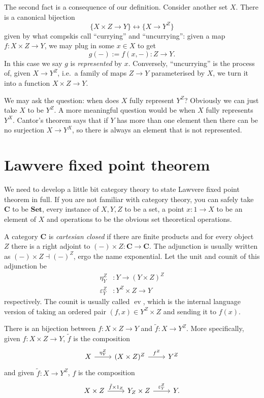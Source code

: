 \documentclass[a4paper]{article}
\renewcommand{\c}[1]{\mathbf{#1}}
\newcommand{\Set}{{\c{Set}}}
\begin{document}
The second fact is a consequence of our definition. Consider another set \(X\). There is a canonical bijection
\[
  \{X \times Z \to Y\} \leftrightarrow \{X \to Y^Z\}
\]
given by what compskis call ``currying'' and ``uncurrying'': given a map \(f: X \times Z \to Y\), we may plug in some \(x \in X\) to get
\[
  g(-) := f(x, -): Z \to Y.
\]
In this case we say \(g\) is \emph{represented} by \(x\). Conversely, ``uncurrying'' is the process of, given \(X \to Y^Z\), i.e.\ a family of maps \(Z \to Y\) parameterised by \(X\), we turn it into a function \(X \times Z \to Y\).

We may ask the question: when does \(X\) fully represent \(Y^Z\)? Obviously we can just take \(X\) to be \(Y^Z\). A more meaningful question would be when \(X\) fully represents \(Y^X\). Cantor's theorem says that if \(Y\) has more than one element then there can be no surjection \(X \to Y^X\), so there is always an element that is not represented.

\section{Lawvere fixed point theorem}

We need to develop a little bit category theory to state Lawvere fixed point theorem in full. If you are not familiar with category theory, you can safely take \(\c C\) to be \(\Set\), every instance of \(X, Y, Z\) to be a set, a point \(x: 1 \to X\) to be an element of \(X\) and operations to be the obvious set theoretical operations.

A category \(\c C\) is \emph{cartesian closed} if there are finite products and for every object \(Z\) there is a right adjoint to \((-) \times Z: \c C \to \c C\). The adjunction is usually written as \((-) \times Z \dashv (-)^Z\), ergo the name exponential. Let the unit and counit of this adjunction be
\begin{align*}
  \eta^Z_Y &: Y \to (Y \times Z)^Z \\
  \varepsilon^Z_Y &: Y^Z \times Z \to Y
\end{align*}
respectively. The counit is usually called \(\operatorname{ev}\), which is the internal language version of taking an ordered pair \((f, x) \in Y^Z \times Z\) and sending it to \(f(x)\).

There is an bijection between \(f: X \times Z \to Y\) and \(\tilde f: X \to Y^Z\). More specifically, given \(f: X \times Z \to Y\), \(\tilde f\) is the composition
\[
  \begin{tikzcd}
    X \ar[r, "\eta_Y^Z"] & (X \times Z)^Z \ar[r, "f^Z"] & Y^Z
  \end{tikzcd}
\]
and given \(\tilde f: X \to Y^Z\), \(f\) is the composition
\[
  \begin{tikzcd}
    X \times Z \ar[r, "\tilde f \times 1_Z"] & Y_Z \times Z \ar[r, "\varepsilon^Z_Y"] & Y.
  \end{tikzcd}
\]
\end{document}
